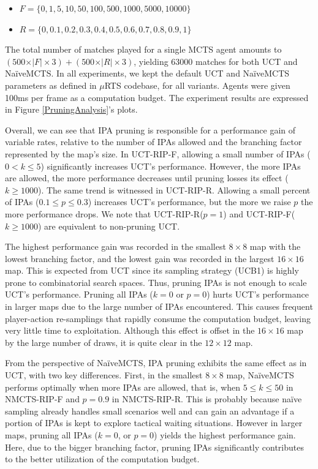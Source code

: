 \documentclass[conference]{IEEEtran}
\newcommand{\mRTS}{$\mu$RTS}
\begin{document}
\begin{itemize}
\item $F = \{0, 1, 5, 10, 50, 100, 500, 1000, 5000, 10000\}$
\item $R = \{0, 0.1, 0.2, 0.3, 0.4, 0.5, 0.6, 0.7, 0.8, 0.9, 1\}$
\end{itemize}

The total number of matches played for a single MCTS agent amounts to $(500\times\vert F\vert\times3) + (500\times\vert R\vert\times3)$, yielding $63000$ matches for both UCT and NaïveMCTS. In all experiments, we kept the default UCT and NaïveMCTS parameters as defined in \mRTS{} codebase, for all variants. Agents were given 100ms per frame as a computation budget. The experiment results are expressed in Figure \ref{PruningAnalysis}'s plots.

Overall, we can see that IPA pruning is responsible for a performance gain of variable rates, relative to the number of IPAs allowed and the branching factor represented by the map's size. In UCT-RIP-F, allowing a small number of IPAs ($0 < k \leq 5$) significantly increases UCT's performance. However, the more IPAs are allowed, the more performance decreases until pruning losses its effect ($k \geq 1000$). The same trend is witnessed in UCT-RIP-R. Allowing a small percent of IPAs ($0.1 \leq p \leq 0.3$) increases UCT's performance, but the more we raise $p$ the more performance drops. We note that UCT-RIP-R($p=1$) and UCT-RIP-F($k \geq 1000$) are equivalent to non-pruning UCT.

The highest performance gain was recorded in the smallest $8\times8$ map with the lowest branching factor, and the lowest gain was recorded in the largest $16\times16$ map. This is expected from UCT since its sampling strategy (UCB1) is highly prone to combinatorial search spaces. Thus, pruning IPAs is not enough to scale UCT's performance. Pruning all IPAs ($k = 0$ or $p = 0$) hurts UCT's performance in larger maps due to the large number of IPAs encountered. This causes frequent player-action re-samplings that rapidly consume the computation budget, leaving very little time to exploitation. Although this effect is offset in the $16\times16$ map by the large number of draws, it is quite clear in the $12\times12$ map.

From the perspective of NaïveMCTS, IPA pruning exhibits the same effect as in UCT, with two key differences. First, in the smallest $8\times8$ map, NaïveMCTS performs optimally when more IPAs are allowed, that is, when $5 \leq k \leq 50$ in NMCTS-RIP-F and $p=0.9$ in NMCTS-RIP-R. This is probably because naïve sampling already handles small scenarios well and can gain an advantage if a portion of IPAs is kept to explore tactical waiting situations. However in larger maps, pruning all IPAs ($k = 0$, or $p = 0$) yields the highest performance gain. Here, due to the bigger branching factor, pruning IPAs significantly contributes to the better utilization of the computation budget.
\end{document}
